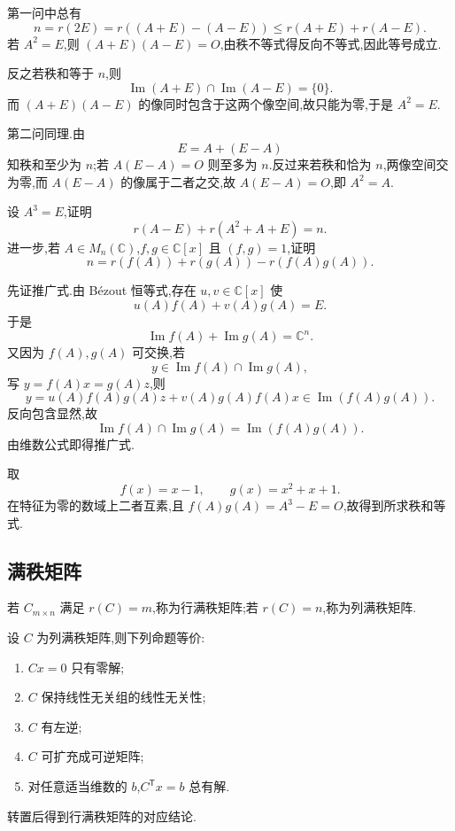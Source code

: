 \begin{solution}
第一问中总有
\[
 n=r(2E)=r((A+E)-(A-E))\leq r(A+E)+r(A-E).
\]
若 $A^2=E$,则 $(A+E)(A-E)=O$,由秩不等式得反向不等式,因此等号成立.

反之若秩和等于 $n$,则
\[
 \operatorname{Im}(A+E)\cap\operatorname{Im}(A-E)=\{0\}.
\]
而 $(A+E)(A-E)$ 的像同时包含于这两个像空间,故只能为零,于是 $A^2=E$.

第二问同理.由
\[
 E=A+(E-A)
\]
知秩和至少为 $n$;若 $A(E-A)=O$ 则至多为 $n$.反过来若秩和恰为 $n$,两像空间交为零,而 $A(E-A)$ 的像属于二者之交,故 $A(E-A)=O$,即 $A^2=A$.
\end{solution}

\begin{example}
设 $A^3=E$,证明
\[
 r(A-E)+r(A^2+A+E)=n.
\]
进一步,若 $A\in M_n(\mathbb{C})$,$f,g\in\mathbb{C}[x]$ 且 $(f,g)=1$,证明
\[
 n=r(f(A))+r(g(A))-r(f(A)g(A)).
\]
\end{example}
\exampleblank

\begin{solution}
先证推广式.由 Bézout 恒等式,存在 $u,v\in\mathbb{C}[x]$ 使
\[
 u(A)f(A)+v(A)g(A)=E.
\]
于是
\[
 \operatorname{Im}f(A)+\operatorname{Im}g(A)=\mathbb{C}^n.
\]
又因为 $f(A),g(A)$ 可交换,若
\[
 y\in\operatorname{Im}f(A)\cap\operatorname{Im}g(A),
\]
写 $y=f(A)x=g(A)z$,则
\[
 y=u(A)f(A)g(A)z+v(A)g(A)f(A)x
 \in\operatorname{Im}(f(A)g(A)).
\]
反向包含显然,故
\[
 \operatorname{Im}f(A)\cap\operatorname{Im}g(A)
 =\operatorname{Im}(f(A)g(A)).
\]
由维数公式即得推广式.

取
\[
 f(x)=x-1,\qquad g(x)=x^2+x+1.
\]
在特征为零的数域上二者互素,且 $f(A)g(A)=A^3-E=O$,故得到所求秩和等式.
\end{solution}

\subsection{满秩矩阵}

\begin{definition}
若 $C_{m\times n}$ 满足 $r(C)=m$,称为行满秩矩阵;若 $r(C)=n$,称为列满秩矩阵.
\end{definition}

\begin{theorem}[\marktwostar]
设 $C$ 为列满秩矩阵,则下列命题等价:
\begin{enumerate}
  \item $Cx=0$ 只有零解;
  \item $C$ 保持线性无关组的线性无关性;
  \item $C$ 有左逆;
  \item $C$ 可扩充成可逆矩阵;
  \item 对任意适当维数的 $b$,$C^{\mathsf T}x=b$ 总有解.
\end{enumerate}
转置后得到行满秩矩阵的对应结论.
\end{theorem}


